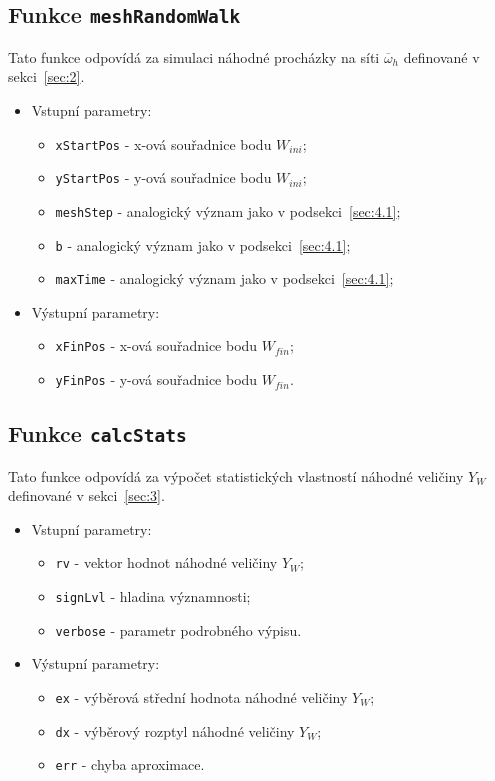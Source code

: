 \documentclass[11pt,american,czech]{article}
\newcommand*\midpoint[1]{\overline{#1}}
\begin{document}
\subsection{Funkce \texttt{meshRandomWalk}}\label{sec:4.2}

Tato funkce odpovídá za simulaci náhodné procházky na síti $\midpoint{\omega}_{h}$ definované v sekci~\ref{sec:2}.

\begin{itemize}
	\item Vstupní parametry:
	\begin{itemize}
			\item \texttt{xStartPos} - x-ová souřadnice bodu $W_{ini}$;
			\item \texttt{yStartPos} - y-ová souřadnice bodu $W_{ini}$;
			\item \texttt{meshStep} - analogický význam jako v podsekci~\ref{sec:4.1};
			\item \texttt{b} - analogický význam jako v podsekci~\ref{sec:4.1};
			\item \texttt{maxTime} - analogický význam jako v podsekci~\ref{sec:4.1};
	\end{itemize}
	\item Výstupní parametry:
	\begin{itemize}
			\item \texttt{xFinPos} - x-ová souřadnice bodu $W_{fin}$;
			\item \texttt{yFinPos} - y-ová souřadnice bodu $W_{fin}$.
	\end{itemize}
\end{itemize}

\subsection{Funkce \texttt{calcStats}}\label{sec:4.3}

Tato funkce odpovídá za výpočet statistických vlastností náhodné veličiny $Y_{W}$ definované v sekci~\ref{sec:3}.

\begin{itemize}
	\item Vstupní parametry:
	\begin{itemize}
		\item \texttt{rv} - vektor hodnot náhodné veličiny $Y_{W}$;
		\item \texttt{signLvl} - hladina významnosti;
		\item \texttt{verbose} - parametr podrobného výpisu.
	\end{itemize}
	\item Výstupní parametry:
	\begin{itemize}
		\item \texttt{ex} - výběrová střední hodnota náhodné veličiny $Y_{W}$;
		\item \texttt{dx} - výběrový rozptyl náhodné veličiny $Y_{W}$;
		\item \texttt{err} - chyba aproximace.
	\end{itemize}
\end{itemize}
\end{document}
